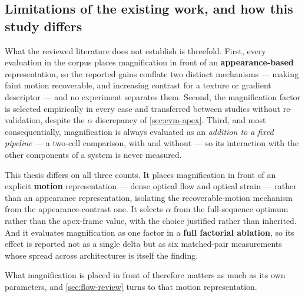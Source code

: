 \subsection{Limitations of the existing work, and how this study differs}
\label{sec:evm-gap}

What the reviewed literature does not establish is threefold. First, every evaluation in the corpus places magnification in front of an \textbf{appearance-based} representation, so the reported gains conflate two distinct mechanisms --- making faint motion recoverable, and increasing contrast for a texture or gradient descriptor --- and no experiment separates them. Second, the magnification factor is selected empirically in every case and transferred between studies without re-validation, despite the $\alpha$ discrepancy of \autoref{sec:evm-apex}. Third, and most consequentially, magnification is always evaluated as an \textit{addition to a fixed pipeline} --- a two-cell comparison, with and without --- so its interaction with the other components of a system is never measured.

This thesis differs on all three counts. It places magnification in front of an explicit \textbf{motion} representation --- dense optical flow and optical strain --- rather than an appearance representation, isolating the recoverable-motion mechanism from the appearance-contrast one. It selects $\alpha$ from the full-sequence optimum rather than the apex-frame value, with the choice justified rather than inherited. And it evaluates magnification as one factor in a \textbf{full factorial ablation}, so its effect is reported not as a single delta but as six matched-pair measurements whose spread across architectures is itself the finding.

What magnification is placed in front of therefore matters as much as its own parameters, and \autoref{sec:flow-review} turns to that motion representation.
